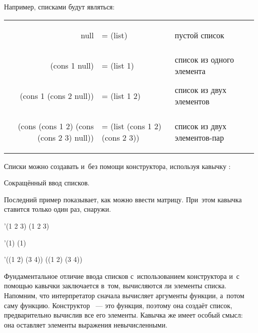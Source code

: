 \newpage
Например, списками будут являться:

\smallskip
\noindent
\begin{tabular}{rl>{\comment}p{2.5cm}}

\begin{ExampleCode}
 null
\end{ExampleCode}& 
\begin{ExampleCode}
= (list)
\end{ExampleCode}& пустой список\\
\begin{ExampleCode}
 (cons 1 null)
\end{ExampleCode}&
\begin{ExampleCode}
= (list 1)
\end{ExampleCode}& список из одного элемента\\
\begin{ExampleCode}
 (cons 1 (cons 2 null))
\end{ExampleCode}&
\begin{ExampleCode}
= (list 1 2)
\end{ExampleCode}& список из двух элементов\\
\begin{ExampleCode}
 (cons (cons 1 2) 
       (cons (cons 2 3)
             null))
\end{ExampleCode} &
\begin{ExampleCode}
= (list (cons 1 2) 
        (cons 2 3))
\end{ExampleCode} & список из двух элементов-пар
\end{tabular}

Списки можно создавать и~без помощи конструктора, используя кавычку :

\begin{example}{Сокращённый ввод списков.

Последний пример показывает, как можно ввести матрицу. При~этом кавычка ставится только один раз, снаружи.}
\REPL
  {'(1 2 3)}
  {(1 2 3)}

\REPL
  {'(1)}
  {(1)}

\REPL
  {'((1 2) (3 4))}
  {((1 2) (3 4))}
\end{example}

Фундаментальное отличие ввода списков с~использованием конструктора и~с помощью кавычки заключается в~том, вычисляются ли элементы списка. Напомним, что интерпретатор \Scheme сначала вычисляет аргументы функции, а~потом саму функцию. Конструктор ~--- это функция, поэтому она создаёт список, предварительно вычислив все его элементы. Кавычка же имеет особый смысл: она оставляет элементы выражения невычисленными. 

